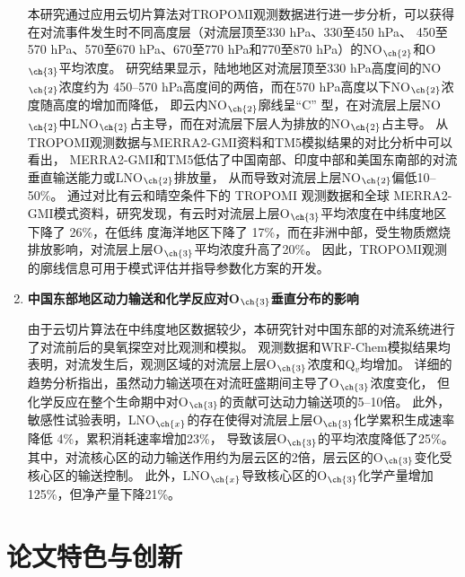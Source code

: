 \begin{enumerate}[label=（\arabic*）, labelindent=\parindent, nosep, leftmargin=0pt, widest=0, itemindent=*, topsep=0pt, partopsep=0pt, parsep=0pt]
\hspace{4ex} 本研究通过应用云切片算法对TROPOMI观测数据进行进一步分析，可以获得在对流事件发生时不同高度层（对流层顶至330 hPa、330至450 hPa、
450至570 hPa、570至670 hPa、670至770 hPa和770至870 hPa）的NO$_{\ch{2}}$和O$_{\ch{3}}$平均浓度。
研究结果显示，陆地地区对流层顶至330 hPa高度间的NO$_{\ch{2}}$浓度约为 450--570 hPa高度间的两倍，而在570 hPa高度以下NO$_{\ch{2}}$浓度随高度的增加而降低，
即云内NO$_{\ch{2}}$廓线呈“C” 型，在对流层上层NO$_{\ch{2}}$中LNO$_{\ch{2}}$占主导，而在对流层下层人为排放的NO$_{\ch{2}}$占主导。
从TROPOMI观测数据与MERRA2-GMI资料和TM5模拟结果的对比分析中可以看出，
MERRA2-GMI和TM5低估了中国南部、印度中部和美国东南部的对流垂直输送能力或LNO$_{\ch{2}}$排放量，
从而导致对流层上层NO$_{\ch{2}}$偏低10--50\%。
通过对比有云和晴空条件下的 TROPOMI 观测数据和全球
MERRA2-GMI模式资料，研究发现，有云时对流层上层O$_{\ch{3}}$平均浓度在中纬度地区下降了 26\%，在低纬
度海洋地区下降了 17\%，而在非洲中部，受生物质燃烧排放影响，对流层上层O$_{\ch{3}}$平均浓度升高了20\%。
因此，TROPOMI观测的廓线信息可用于模式评估并指导参数化方案的开发。

\item \textbf{中国东部地区动力输送和化学反应对O$_{\ch{3}}$垂直分布的影响}

\hspace{4ex} 由于云切片算法在中纬度地区数据较少，本研究针对中国东部的对流系统进行了对流前后的臭氧探空对比观测和模拟。
观测数据和WRF-Chem模拟结果均表明，对流发生后，观测区域的对流层上层O$_{\ch{3}}$浓度和Q$_v$均增加。
详细的趋势分析指出，虽然动力输送项在对流旺盛期间主导了O$_{\ch{3}}$浓度变化，
但化学反应在整个生命期中对O$_{\ch{3}}$的贡献可达动力输送项的5--10倍。
此外，敏感性试验表明，LNO$_{\ch{x}}$的存在使得对流层上层O$_{\ch{3}}$化学累积生成速率降低 4\%，累积消耗速率增加23\%，
导致该层O$_{\ch{3}}$的平均浓度降低了25\%。
其中，对流核心区的动力输送作用约为层云区的2倍，层云区的O$_{\ch{3}}$变化受核心区的输送控制。
此外，LNO$_{\ch{x}}$导致核心区的O$_{\ch{3}}$化学产量增加125\%，但净产量下降21\%。


\end{enumerate}

\section{论文特色与创新}

